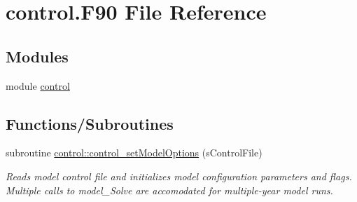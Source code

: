 \hypertarget{control_8_f90}{
\section{control.F90 File Reference}
\label{control_8_f90}
}
\subsection*{Modules}
\begin{DoxyCompactItemize}
\item 
module \hyperlink{namespacecontrol}{control}
\end{DoxyCompactItemize}
\subsection*{Functions/Subroutines}
\begin{DoxyCompactItemize}
\item 
subroutine \hyperlink{namespacecontrol_af1ae32af002bb43d83f3a2120d86e59c}{control::control\_\-setModelOptions} (sControlFile)
\begin{DoxyCompactList}\small\item\em Reads model control file and initializes model configuration parameters and flags. Multiple calls to model\_\-Solve are accomodated for multiple-\/year model runs. \item\end{DoxyCompactList}\end{DoxyCompactItemize}
